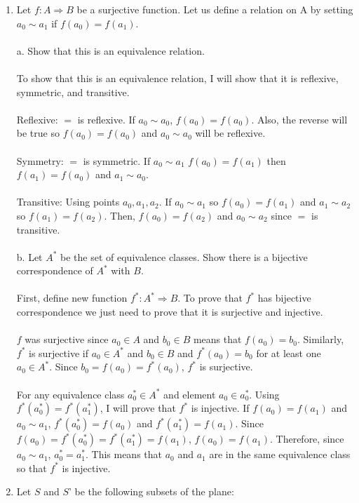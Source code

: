 \documentclass[]{article}
\begin{document}
\begin{enumerate}
    \item Let $f: A \Rightarrow B$ be a surjective function. Let us define a relation on A by setting $a_0 \sim a_1$ if $f(a_0)=f(a_1)$.
    \\\\a. Show that this is an equivalence relation.
    \\\\ To show that this is an equivalence relation, I will show that it is reflexive, symmetric, and transitive. 
    \\\\ Reflexive: $=$ is reflexive. If $a_0 \sim a_0$, $f(a_0)=f(a_0)$. Also, the reverse will be true so $f(a_0)=f(a_0)$ and $a_0 \sim a_0$ will be reflexive.
    \\\\ Symmetry: $=$ is symmetric. If $a_0 \sim a_1$ $f(a_0)=f(a_1)$ then $f(a_1)=f(a_0)$ and $a_1 \sim a_0$.
    \\\\ Transitive: Using points $a_0,a_1,a_2$. If $a_0 \sim a_1$ so $f(a_0)=f(a_1)$ and $a_1 \sim a_2$ so $f(a_1)=f(a_2)$. Then, $f(a_0)=f(a_2)$ and $a_0 \sim a_2$ since $=$ is transitive.
    \\\\b. Let $A^*$ be the set of equivalence classes. Show there is a bijective correspondence of $A^*$ with $B$.
    \\\\First, define new function $f^*:A^* \Rightarrow B$. To prove that $f^*$ has bijective correspondence we just need to prove that it is surjective and injective.
    \\\\$f$ was surjective since $a_0 \in A$ and $b_0 \in B$ means that $f(a_0)=b_0$. Similarly, $f^*$ is surjective if $a_0 \in A^*$ and $b_0 \in B$ and $f^*(a_0)=b_0$ for at least one $a_0 \in A^*$. Since $b_0=f(a_0)=f^*(a_0)$, $f^*$ is surjective.
    \\\\ For any equivalence class $a^*_0 \in A^*$ and element $a_0 \in a^*_0$. Using $f^*(a^*_0)=f^*(a^*_1)$, I will prove that $f^*$ is injective. If $f(a_0)=f(a_1)$ and $a_0 \sim a_1$, $f^*(a^*_0)=f(a_0)$ and $f^*(a^*_1)=f(a_1)$. Since $f(a_0)=f^*(a^*_0)=f^*(a^*_1)=f(a_1)$, $f(a_0)=f(a_1)$. Therefore, since $a_0 \sim a_1$, $a^*_0=a^*_1$. This means that $a_0$ and $a_1$ are in the same equivalence class so that $f^*$ is injective.
    \item Let $S$ and $S$' be the following subsets of the plane:

\end{enumerate}
\end{document}
